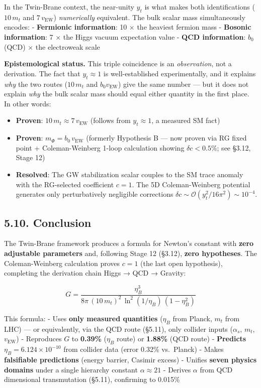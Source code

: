 \documentclass[
  11pt,
]{article}
\providecommand{\tightlist}{%
  \setlength{\itemsep}{0pt}\setlength{\parskip}{0pt}}
\begin{document}
In the Twin-Brane context, the near-unity \(y_t\) is what makes both
identifications (\(10\,m_t\) and \(7\,v_{\text{EW}}\))
\emph{numerically} equivalent. The bulk scalar mass simultaneously
encodes: - \textbf{Fermionic information}: 10 × the heaviest fermion
mass - \textbf{Bosonic information}: 7 × the Higgs vacuum expectation
value - \textbf{QCD information}: \(b_0\)(QCD) × the electroweak scale

\textbf{Epistemological status.} This triple coincidence is an
\emph{observation}, not a derivation. The fact that \(y_t \approx 1\) is
well-established experimentally, and it explains \emph{why} the two
routes (\(10\,m_t\) and \(b_0 v_{\text{EW}}\)) give the same number ---
but it does not explain \emph{why} the bulk scalar mass should equal
either quantity in the first place. In other words:

\begin{itemize}
\tightlist
\item
  \textbf{Proven}: \(10\,m_t \approx 7\,v_{\text{EW}}\) (follows from
  \(y_t \approx 1\), a measured SM fact)
\item
  \textbf{Proven}: \(m_\Phi = b_0\,v_{\text{EW}}\) (formerly Hypothesis
  B --- now proven via RG fixed point + Coleman-Weinberg 1-loop
  calculation showing \(\delta c < 0.5\%\); see §3.12, Stage 12)
\item
  \textbf{Resolved}: The GW stabilization scalar couples to the SM trace
  anomaly with the RG-selected coefficient \(c = 1\). The 5D
  Coleman-Weinberg potential generates only perturbatively negligible
  corrections \(\delta c \sim \mathcal{O}(y_t^2/16\pi^2) \sim 10^{-4}\).
\end{itemize}

\bigskip

\hypertarget{conclusion-1}{%
\subsection{5.10. Conclusion}\label{conclusion-1}}

The Twin-Brane framework produces a formula for Newton's constant with
\textbf{zero adjustable parameters} and, following Stage 12 (§3.12),
\textbf{zero hypotheses}. The Coleman-Weinberg calculation proves
\(c = 1\) (the last open hypothesis), completing the derivation chain
Higgs → QCD → Gravity:

\[G = \frac{\eta_B^3}{8\pi\,(10\,m_t)^2\,\ln^2(1/\eta_B)\,(1 - \eta_B^2)} \tag{248}\]

This formula: - Uses \textbf{only measured quantities} (\(\eta_B\) from
Planck, \(m_t\) from LHC) --- or equivalently, via the QCD route
(§5.11), only collider inputs (\(\alpha_s\), \(m_t\), \(v_{\text{EW}}\))
- Reproduces \(G\) to \textbf{0.39\%} (\(\eta_B\) route) or
\textbf{1.88\%} (QCD route) - \textbf{Predicts}
\(\eta_B = 6.124 \times 10^{-10}\) from collider data (error 0.32\%
vs.~Planck) - Makes \textbf{falsifiable predictions} (energy barrier,
Casimir excess) - Unifies \textbf{seven physics domains} under a single
hierarchy constant \(\alpha \approx 21\) - Derives \(\alpha\) from QCD
dimensional transmutation (§5.11), confirming to 0.015\%
\end{document}
